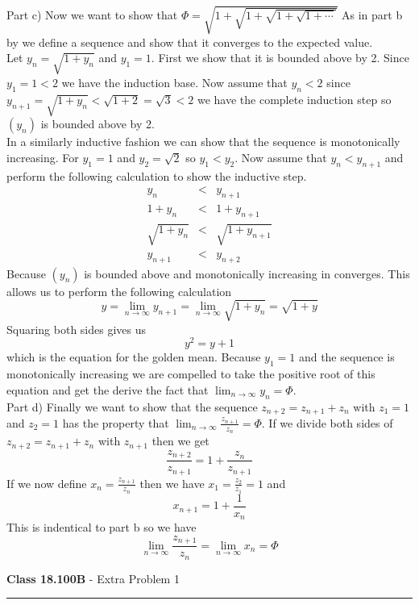 \documentclass[11pt,reqno]{article}
\begin{document}
Part c) Now we want to show that $\Phi = \sqrt{1 + \sqrt{1 + \sqrt{1 + \sqrt{1 + \cdots }}}} $%
As in part b by we define a sequence and show that it converges to the expected value.\\
\indent Let $y_n = \sqrt{1 + y_n}$ and $y_1 = 1$. First we show that it is bounded above by 2. Since $y_1 = 1 < 2$ we have the induction base. Now assume that $y_n < 2$ since $y_{n+1} = \sqrt{1 + y_n} < \sqrt{1 + 2} = \sqrt{3} < 2$ we have the complete induction step so $(y_n)$ is bounded above by 2.\\
\indent In a similarly inductive fashion we can show that the sequence is monotonically increasing. For $y_1 = 1$ and $y_2 = \sqrt{2}$ so $y_1 < y_2$. Now assume that $y_n < y_{n+1}$ and perform the following calculation to show the inductive step.
\begin{eqnarray*}
y_n &<& y_{n+1} \\
1 + y_n &<& 1 + y_{n+1} \\
\sqrt{1 + y_n} &<& \sqrt{1 + y_{n+1}} \\
y_{n+1} &<& y_{n+2}
\end{eqnarray*}
Because $(y_n)$ is bounded above and monotonically increasing in converges. This allows us to perform the following calculation
\[ y = \lim_{n \to \infty} y_{n+1} = \lim_{n \to \infty} \sqrt{1 + y_n} = \sqrt{1 + y}  \]
Squaring both sides gives us \[ y^2 = y + 1 \] which is the equation for the golden mean. Because $y_1 = 1$ and the sequence is monotonically increasing we are compelled to take the positive root of this equation and get the derive the fact that $\lim_{n \to \infty} y_n = \Phi$.\\

Part d) Finally we want to show that the sequence $z_{n+2} = z_{n+1} + z_n$ with $z_1 = 1$ and $z_2 = 1$ has the property that $\lim_{n \to \infty} \frac{z_{n+1}}{z_{n}} = \Phi$. If we divide both sides of $z_{n+2} = z_{n+1} + z_n$ with $z_{n+1}$ then we get 
\[ \frac{z_{n+2}}{z_{n+1}} = 1 + \frac{z_n}{z_{n+1}} \]
 If we now define $x_n = \frac{z_{n+1}}{z_n}$ then we have $x_1 = \frac{z_2}{z_1} = 1$ and 
\[ x_{n+1} = 1 + \frac{1}{x_n}\] 
This is indentical to part b so we have 
\[ \lim_{n \to \infty}  \frac{z_{n+1}}{z_n} = \lim_{n \to \infty} x_n = \Phi\]

\indent 
\vspace{15pt}
\begin{flushleft} 
\textbf{Class 18.100B} - Extra Problem 1\\
\rule{500pt}{1pt}\\
\end{flushleft} 
\end{document}
